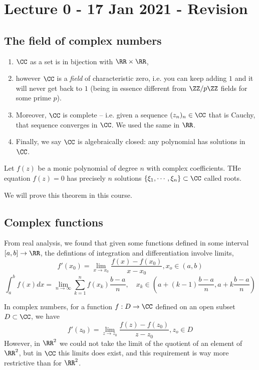 \section{Lecture 0 - 17 Jan 2021 - Revision}
\subsection{The field of complex numbers}
\begin{enumerate}
  \item $\CC$ as a set is in bijection with $\RR\times\RR$,
  \item however $\CC$ is a \emph{field} of characteristic zero, i.e. you can
    keep adding $1$ and it will never get back to $1$ (being in essence
    different from $\ZZ/p\ZZ$ fields for some prime $p$).
  \item Moreover, $\CC$ is complete -- i.e. given a sequence $(z_n)_n\in\CC$
    that is Cauchy, that sequence converges in $\CC$. We used the same in $\RR$. 
  \item  Finally, we say $\CC$ is algebraically closed: any polynomial has
    solutions in $\CC$.
\end{enumerate}

\begin{theorem}
  Let $f(z)$ be a monic polynomial of degree $n$ with complex coefficients. THe
  equation $f(z)=0$ has precisely $n$ solutions $\{\xi_1,\cdots,
  \xi_n\}\subset\CC$ called roots.
  \label{thm:fta}
\end{theorem}
We will prove this theorem in this course.

\subsection{Complex functions}
From real analysis, we found that given some functions defined in some interval
$[a,b]\to\RR$, the defintions of integration and differentiation involve limits, 
\[f'(x_0)= \lim_{x\to x_0} \frac{f(x)-f(x_0)}{x-x_0}, x_o\in (a,b)\]
\[\int_a^b f(x) dx = \lim_{n\to\infty}\sum_{k=1}^n f(x_k) \frac{b-a}{n}, \quad
x_k \in (a+(k-1)\frac{b-a}{n}, a+k\frac{b-a}{n})\]

In complex numbers, for a function $f:D\to\CC$ defined on an open subset
$D\subset\CC$, we have
\[f'(z_0)= \lim_{z\to z_0} \frac{f(z)-f(z_0)}{z-z_0}, z_o\in D\]
However, in $\RR^2$ we could not take the limit of the quotient of an element of
$\RR^2$, but in $\CC$ this limits does exist, and this requirement is way more
restrictive than for $\RR^2$.


